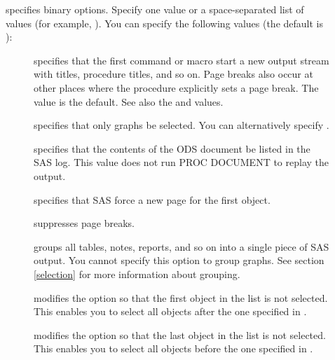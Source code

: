 \documentclass[article,oneside]{memoir}
\begin{document}
\begin{description}
  \item[] specifies binary options.  Specify one value or a space-separated
  list of values (for example, ).
  You can specify the following values (the default is ):

  \begin{description}
  \item[] specifies that the first 
  command or  macro start a new output stream with
  titles, procedure titles, and so on.
  Page breaks also occur at other places where the procedure
  explicitly sets a page break. The  value is the default.
  See also the  and  values.

 \item[] specifies that only graphs be selected.
  You can alternatively specify .

  \item[] specifies that the contents of the ODS document be listed
  in the SAS log. This value does not run PROC DOCUMENT to replay the output.

  \item[] specifies that SAS force a new page for the first object.

  \item[] suppresses page breaks.

  \item[] groups all tables, notes, reports, and so on into a
  single piece of SAS output. You cannot specify this option to group graphs.
  See section \ref{selection} for more information about grouping.

  \item[] modifies the  option so that the first object in the
  list is not selected. This enables you to select all objects after the one
  specified in .

  \item[] modifies the  option so that the last object
  in the list is not selected. This enables you to select all objects before
  the one specified in .\label{skiplast}


\end{description}
\end{description}
\end{document}
